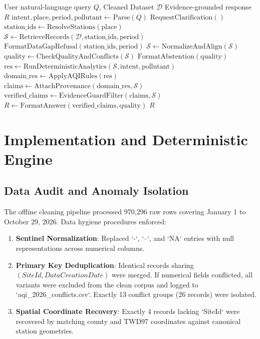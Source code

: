 \documentclass[conference]{IEEEtran}
\begin{document}
\begin{algorithm}[h]
\caption{Taiwan Air Quality Evidence Agent}
\label{alg:agent}
\begin{algorithmic}[1]
\REQUIRE User natural-language query $Q$, Cleaned Dataset $\mathcal{D}$
\ENSURE Evidence-grounded response $R$
\STATE $\text{intent}, \text{place}, \text{period}, \text{pollutant} \leftarrow \text{Parse}(Q)$
    \RETURN $\text{RequestClarification}()$
\ENDIF
\STATE $\text{station\_ids} \leftarrow \text{ResolveStations}(\text{place})$
\STATE $\mathcal{S} \leftarrow \text{RetrieveRecords}(\mathcal{D}, \text{station\_ids}, \text{period})$
    \RETURN $\text{FormatDataGapRefusal}(\text{station\_ids}, \text{period})$
\ENDIF
\STATE $\mathcal{S} \leftarrow \text{NormalizeAndAlign}(\mathcal{S})$
\STATE $\text{quality} \leftarrow \text{CheckQualityAndConflicts}(\mathcal{S})$
    \RETURN $\text{FormatAbstention}(\text{quality})$
\ENDIF
\STATE $\text{res} \leftarrow \text{RunDeterministicAnalytics}(\mathcal{S}, \text{intent}, \text{pollutant})$
\STATE $\text{domain\_res} \leftarrow \text{ApplyAQIRules}(\text{res})$
\STATE $\text{claims} \leftarrow \text{AttachProvenance}(\text{domain\_res}, \mathcal{S})$
\STATE $\text{verified\_claims} \leftarrow \text{EvidenceGuardFilter}(\text{claims}, \mathcal{S})$
\STATE $R \leftarrow \text{FormatAnswer}(\text{verified\_claims}, \text{quality})$
\RETURN $R$
\end{algorithmic}
\end{algorithm}

\section{Implementation and Deterministic Engine}

\subsection{Data Audit and Anomaly Isolation}
The offline cleaning pipeline processed 970,296 raw rows covering January 1 to October 29, 2026. Data hygiene procedures enforced:
\begin{enumerate}
    \item \textbf{Sentinel Normalization}: Replaced `-`, `--`, and `NA` entries with null representations across numerical columns.
    \item \textbf{Primary Key Deduplication}: Identical records sharing $(SiteId, DataCreationDate)$ were merged. If numerical fields conflicted, all variants were excluded from the clean corpus and logged to `aqi_2026_conflicts.csv`. Exactly 13 conflict groups (26 records) were isolated.
    \item \textbf{Spatial Coordinate Recovery}: Exactly 4 records lacking `SiteId` were recovered by matching county and TWD97 coordinates against canonical station geometries.
\end{enumerate}
\end{document}
